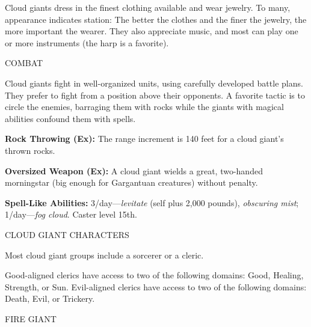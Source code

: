 \documentclass{article}
\begin{document}
Cloud giants dress in the finest clothing available and wear jewelry. To many, 
appearance indicates station: The better the clothes and the finer the jewelry, 
the more important the wearer. They also appreciate music, and most can play one 
or more instruments (the harp is a favorite).

COMBAT

Cloud giants fight in well-organized units, using carefully developed battle plans. 
They prefer to fight from a position above their opponents. A favorite tactic is 
to circle the enemies, barraging them with rocks while the giants with magical 
abilities confound them with spells.

\textbf{Rock Throwing (Ex):} The range increment is 140 feet for a cloud giant's 
thrown rocks.

\textbf{Oversized Weapon (Ex):} A cloud giant wields a great, two-handed morningstar 
(big enough for Gargantuan creatures) without penalty.

\textbf{Spell-Like Abilities:} 3/day---\textit{levitate }(self plus 2,000 pounds), 
\textit{obscuring mist}; 1/day---\textit{fog cloud}. Caster level 15th.

\vspace{12pt}
CLOUD GIANT CHARACTERS

Most cloud giant groups include a sorcerer or a cleric.

Good-aligned clerics have access to two of the following domains: Good, Healing, 
Strength, or Sun. Evil-aligned clerics have access to two of the following domains: 
Death, Evil, or Trickery.

\vspace{12pt}
FIRE GIANT
\end{document}
